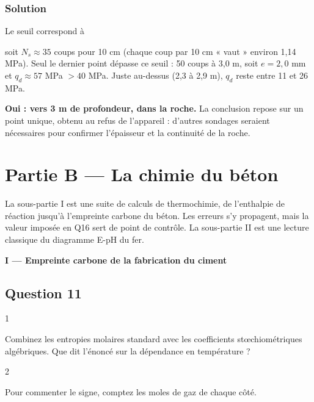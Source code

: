 \documentclass[11pt,a4paper]{article}
\newcommand{\equationajustee}[1]{%
  \sbox{\boiteequation}{$\displaystyle #1$}%
  \ifdim\wd\boiteequation>\linewidth
    \[\resizebox{\linewidth}{!}{\usebox{\boiteequation}}\]%
  \else
    \[#1\]%
  \fi}
\begin{document}
\hypertarget{solution-9}{%
\subsubsection{Solution}\label{solution-9}}

Le seuil correspond à

\equationajustee{e_s = \frac{MgH}{S\,q_d}\frac{M}{M+m} = 2{,}9\ \mathrm{mm},}

soit \(N_s\approx35\) coups pour 10 cm (chaque coup par 10 cm « vaut » environ 1,14 MPa). Seul le dernier point dépasse ce seuil : 50 coups à 3,0 m, soit \(e = 2{,}0\) mm et \(q_d\approx57\) MPa \(> 40\) MPa. Juste au-dessus (2,3 à 2,9 m), \(q_d\) reste entre 11 et 26 MPa.

\textbf{Oui : vers 3 m de profondeur, dans la roche.} La conclusion repose sur un point unique, obtenu au refus de l'appareil : d'autres sondages seraient nécessaires pour confirmer l'épaisseur et la continuité de la roche.

\hypertarget{partie-b-la-chimie-du-buxe9ton}{%
\section{Partie B --- La chimie du béton}\label{partie-b-la-chimie-du-buxe9ton}}

La sous-partie I est une suite de calculs de thermochimie, de l'enthalpie de réaction jusqu'à l'empreinte carbone du béton. Les erreurs s'y propagent, mais la valeur imposée en Q16 sert de point de contrôle. La sous-partie II est une lecture classique du diagramme E-pH du fer.

\textbf{I --- Empreinte carbone de la fabrication du ciment}

\hypertarget{question-11}{%
\subsection{Question 11}\label{question-11}}

\begin{indication}{1}

Combinez les entropies molaires standard avec les coefficients stœchiométriques algébriques. Que dit l'énoncé sur la dépendance en température ?

\end{indication}

\begin{indication}{2}

Pour commenter le signe, comptez les moles de gaz de chaque côté.

\end{indication}
\end{document}
